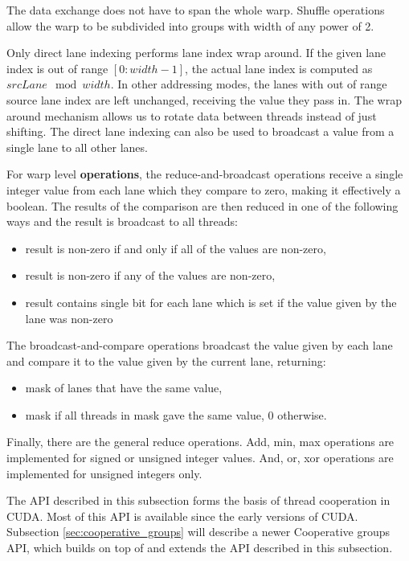 The data exchange does not have to span the whole warp. Shuffle operations allow the warp to be subdivided into groups with width of any power of 2.

Only direct lane indexing performs lane index wrap around. If the given lane index is out of range $[0:width - 1]$, the actual lane index is computed as $srcLane \mod width$. In other addressing modes, the lanes with out of range source lane index are left unchanged, receiving the value they pass in. The wrap around mechanism allows us to rotate data between threads instead of just shifting. The direct lane indexing can also be used to broadcast a value from a single lane to all other lanes. %

For warp level \textbf{operations}, the reduce-and-broadcast operations receive a single integer value from each lane which they compare to zero, making it effectively a boolean. The results of the comparison are then reduced in one of the following ways and the result is broadcast to all threads:
\begin{itemize}
	\item result is non-zero if and only if all of the values are non-zero,
	\item result is non-zero if any of the values are non-zero,
	\item result contains single bit for each lane which is set if the value given by the lane was non-zero
\end{itemize}

The broadcast-and-compare operations broadcast the value given by each lane and compare it to the value given by the current lane, returning:
\begin{itemize}
	\item mask of lanes that have the same value,
	\item mask if all threads in mask gave the same value, 0 otherwise.
\end{itemize}

Finally, there are the general reduce operations. Add, min, max operations are implemented for signed or unsigned integer values. And, or, xor operations are implemented for unsigned integers only.

The API described in this subsection forms the basis of thread cooperation in CUDA. Most of this API is available since the early versions of CUDA. Subsection \ref{sec:cooperative_groups} will describe a newer Cooperative groups API, which builds on top of and extends the API described in this subsection.

